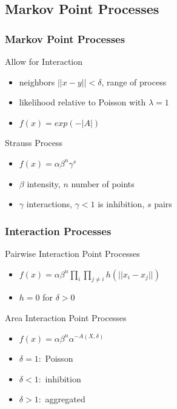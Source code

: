 \documentclass[nototal,handout]{beamer}
\begin{document}
 \subsection{Markov Point Processes}

 \begin{frame}
   \frametitle{Markov Point Processes}
   \begin{block}{Allow for Interaction}
     \begin{itemize}
       \item neighbors $||x - y || < \delta $, range of process
       \item likelihood relative to Poisson with $\lambda=1$
       \item $f(x) = exp(-|A|)$
     \end{itemize}
    \end{block}
\begin{block}{Strauss Process}
     \begin{itemize}
       \item $f(x) = \alpha \beta^n \gamma^s$
       \item $\beta$ intensity, $n$ number of points
       \item $\gamma$ interactions, $\gamma < 1$ is inhibition, $s$ pairs
     \end{itemize}
    \end{block}
  \end{frame}

  \begin{frame}
    \frametitle{Interaction Processes}
    \begin{block}{Pairwise Interaction Point Processes}
      \begin{itemize}
	\item $f(x) = \alpha \beta^n \prod_i \prod_{j\ne i} h(||x_i -
	  x_j||)$
	\item $h=0$ for $\delta > 0$
      \end{itemize}
     \end{block}
     \begin{block}{Area Interaction Point Processes}
       \begin{itemize}
	 \item $f(x) = \alpha \beta^n \alpha^{-A (X,\delta)}$
	 \item $\delta = 1:$ Poisson
	 \item $\delta < 1:$ inhibition
	 \item $\delta > 1:$ aggregated
       \end{itemize}
     \end{block}
   \end{frame}
\end{document}
